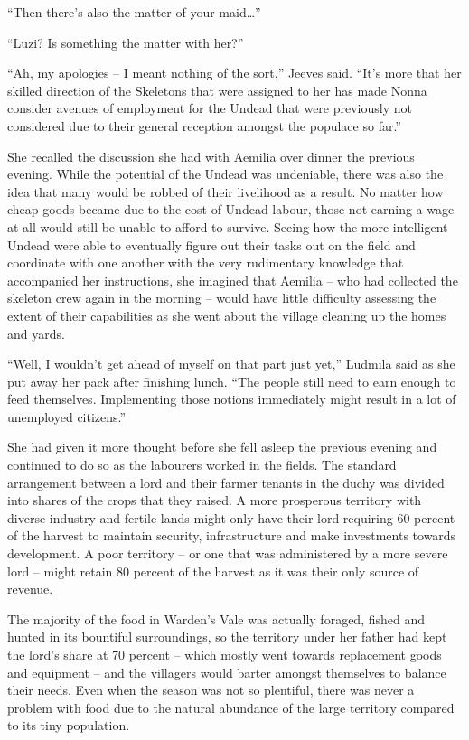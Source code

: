 “Then there’s also the matter of your maid…”

 

“Luzi? Is something the matter with her?”

 

“Ah, my apologies – I meant nothing of the sort,” Jeeves said. “It’s more that her skilled direction of the Skeletons that were assigned to her has made Nonna consider avenues of employment for the Undead that were previously not considered due to their general reception amongst the populace so far.”

 

She recalled the discussion she had with Aemilia over dinner the previous evening. While the potential of the Undead was undeniable, there was also the idea that many would be robbed of their livelihood as a result. No matter how cheap goods became due to the cost of Undead labour, those not earning a wage at all would still be unable to afford to survive. Seeing how the more intelligent Undead were able to eventually figure out their tasks out on the field and coordinate with one another with the very rudimentary knowledge that accompanied her instructions, she imagined that Aemilia – who had collected the skeleton crew again in the morning – would have little difficulty assessing the extent of their capabilities as she went about the village cleaning up the homes and yards.

 

“Well, I wouldn’t get ahead of myself on that part just yet,” Ludmila said as she put away her pack after finishing lunch. “The people still need to earn enough to feed themselves. Implementing those notions immediately might result in a lot of unemployed citizens.”

 

She had given it more thought before she fell asleep the previous evening and continued to do so as the labourers worked in the fields. The standard arrangement between a lord and their farmer tenants in the duchy was divided into shares of the crops that they raised. A more prosperous territory with diverse industry and fertile lands might only have their lord requiring 60 percent of the harvest to maintain security, infrastructure and make investments towards development. A poor territory – or one that was administered by a more severe lord – might retain 80 percent of the harvest as it was their only source of revenue.

 

The majority of the food in Warden’s Vale was actually foraged, fished and hunted in its bountiful surroundings, so the territory under her father had kept the lord’s share at 70 percent – which mostly went towards replacement goods and equipment – and the villagers would barter amongst themselves to balance their needs. Even when the season was not so plentiful, there was never a problem with food due to the natural abundance of the large territory compared to its tiny population.

